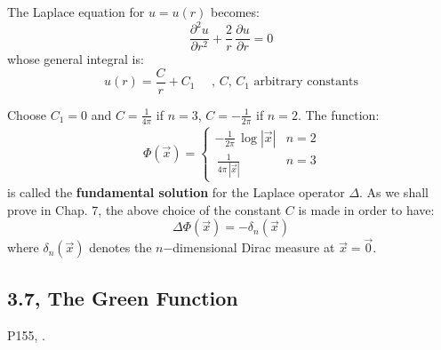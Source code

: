 \documentclass[../main.tex]{subfiles}
\begin{document}
The Laplace equation for $u = u(r)$ becomes:
\begin{equation} \label{eq:LE56}
    \frac{\partial^2 u}{\partial r^2} + \frac{2}{r} \, \frac{\partial u}{\partial r} = 0
\end{equation} \label{eq:LE52}
whose general integral is:
\begin{equation} \label{eq:LE57}
    u(r) = \frac{C}{r} + C_1 \quad \text{ ,  $C$, $C_1$ arbitrary constants}
\end{equation}

Choose $C_1 = 0$ and $C= \frac{1}{4 \pi}$ if $n = 3$, $C = − \frac{1}{2 \pi}$ if $n = 2$. The function:
\begin{align} \label{eq:LE58}
    \, \Phi(\vec{x}) = \begin{cases} - \frac{1}{2 \pi} \, \log{|\vec{x}|} & n = 2 \\
    \, \frac{1}{4 \pi \, |\vec{x}|} & n = 3
    \end{cases}
\end{align}
is called the \textbf{fundamental solution} for the Laplace operator $\Delta$. As we shall prove in Chap. 7, the above choice of the constant $C$ is made in order to have:
\begin{equation} \label{eq:LE59}
    \Delta \Phi(\vec{x}) = - \delta_n(\vec{x})
\end{equation}
where $\delta_n(\vec{x})$ denotes the $n$−dimensional Dirac measure at $\vec{x} = \vec{0}$.

\subsection{3.7, The Green Function}

P155, \cite{salsa2016partial}.
\end{document}
